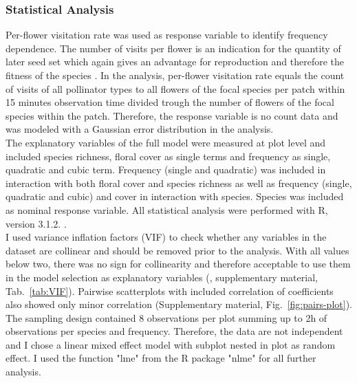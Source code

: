 \subsubsection*{Statistical Analysis}
Per-flower visitation rate was used as response variable to identify frequency dependence. The number of visits per flower is an indication for the quantity of later seed set which again gives an advantage for reproduction and therefore the fitness of the species \citep{vazquez2005interaction}. In the analysis, per-flower visitation rate equals the count of visits of all pollinator types to all flowers of the focal species per patch within 15 minutes observation time divided trough the number of flowers of the focal species within the patch. Therefore, the response variable is no count data and was modeled with a Gaussian error distribution in the analysis.\\
The explanatory variables of the full model were measured at plot level and included species richness, floral cover as single terms and frequency as single, quadratic and cubic term. Frequency (single and quadratic) was included in interaction with both floral cover and species richness as well as frequency (single, quadratic and cubic) and cover in interaction with species. Species was included as nominal response variable. All statistical analysis were performed with R, version 3.1.2. \citep{R}. \\
I used variance inflation factors (VIF) to check whether any variables in the dataset are collinear and should be removed prior to the analysis. With all values below two, there was no sign for collinearity and therefore acceptable to use them in the model selection as explanatory variables (\citealt{zuur2007analysing}, supplementary material, Tab.~\ref{tab:VIF}). Pairwise scatterplots with included correlation of coefficients also showed only minor correlation (Supplementary material, Fig.~\ref{fig:pairs-plot}).\\
The sampling design contained 8 observations per plot summing up to 2h of observations per species and frequency. Therefore, the data are not independent and I chose a linear mixed effect model with subplot nested in plot as random effect. I used the function "lme" from the R package "nlme" \citep{Rnlme} for all further analysis.\\

